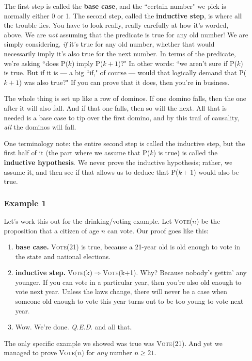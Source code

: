 The first step is called the \textbf{base case}, and the ``certain number"
we pick is normally either 0 or 1. The second step, called the
\textbf{inductive step}, is where all the trouble lies. You have to look
really, really carefully at how it's worded, above. We are \textit{not}
assuming that the predicate is true for any old number! We are simply
considering, \textit{if} it's true for any old number, whether that would
necessarily imply it's also true for the next number. In terms of the
predicate, we're asking ``does P($k$) imply P($k+1$)?" In other words: ``we
aren't sure if P($k$) is true. But if it is --- a big ``if," of course
--- would that logically demand that P($k+1$) was also true?" If you can
prove that it does, then you're in business.

The whole thing is set up like a row of dominos. If one domino falls, then
the one after it will also fall. And if that one falls, then so will the
next. All that is needed is a base case to tip over the first domino, and
by this trail of causality, \textit{all} the dominos will fall.

One terminology note: the entire second step is called the inductive step,
but the first half of it (the part where we assume that P($k$) is true) is
called the \textbf{inductive hypothesis}. We never prove the inductive
hypothesis; rather, we assume it, and then see if that allows us to deduce
that P($k+1$) would also be true.


\subsubsection{Example 1}

Let's work this out for the drinking/voting example. Let \textsc{Vote}($n$)
be the proposition that a citizen of age $n$ can vote. Our proof goes like
this:
\begin{enumerate} 

\item \textbf{base case.} \textsc{Vote}(21) is true, because a 21-year old
is old enough to vote in the state and national elections.

\item \textbf{inductive step.}
\textsc{Vote}(k)$\Rightarrow$\textsc{Vote}(k+1). Why? Because nobody's
gettin' any younger. If you can vote in a particular year, then you're also
old enough to vote next year. Unless the laws change, there will never be a
case when someone old enough to vote this year turns out to be too young to
vote next year.

\item Wow. We're done. \textit{Q.E.D.} and all that.
\end{enumerate}
The only specific example we showed was true was \textsc{Vote}(21). And yet
we managed to prove \textsc{Vote}($n$) for \textit{any} number $n\geq21$.

